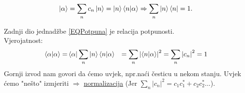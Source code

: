 \documentclass{article}
\numberwithin{equation}{section}
\begin{document}
\begin{equation}
	\ket{\alpha} = \sum_n c_n \ket{n} = \ket{n}\braket{n|\alpha} \Rightarrow \sum_n \ket{n}\bra{n} = 1.
	\label{EQPotpuna}
\end{equation}

Zadnji dio jednadžbe \ref{EQPotpuna} je relacija potpunosti.\\
Vjerojatnost:
\begin{equation}
	\begin{aligned}
		\braket{\alpha|\alpha} = & \braket{\alpha|\sum_n|n}\braket{n|\alpha}
		                         & = \sum_n \left|\braket{n|\alpha}\right|^2 = \sum_n \left|c_n\right|^2=1
	\end{aligned}
\end{equation}
Gornji izvod nam govori da ćemo uvjek, npr.naći česticu u nekom stanju. Uvjek ćemo "nešto" izmjeriti $\Rightarrow$ \underline{normalizacija}
(Jer $\sum_n\left|c_n\right|^2 = c_1c_1^* + c_2c_2^*...$).
\end{document}
